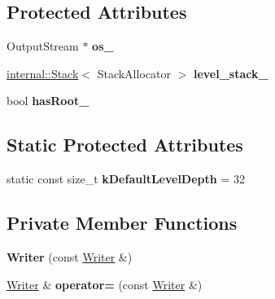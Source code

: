 \subsection*{Protected Attributes}
\begin{DoxyCompactItemize}
\item 
Output\+Stream $\ast$ {\bfseries os\+\_\+}\hypertarget{class_writer_a51ba99f008df7bbf32de311aa22b05ae}{}\label{class_writer_a51ba99f008df7bbf32de311aa22b05ae}

\item 
\hyperlink{classinternal_1_1_stack}{internal\+::\+Stack}$<$ Stack\+Allocator $>$ {\bfseries level\+\_\+stack\+\_\+}\hypertarget{class_writer_af179a9f272f80414d48f64ede9ddde12}{}\label{class_writer_af179a9f272f80414d48f64ede9ddde12}

\item 
bool {\bfseries has\+Root\+\_\+}\hypertarget{class_writer_af252ff409093ea786d5efce0d08d3804}{}\label{class_writer_af252ff409093ea786d5efce0d08d3804}

\end{DoxyCompactItemize}
\subsection*{Static Protected Attributes}
\begin{DoxyCompactItemize}
\item 
static const size\+\_\+t {\bfseries k\+Default\+Level\+Depth} = 32\hypertarget{class_writer_aad47efc97708b2a64e4a0994cbbfae25}{}\label{class_writer_aad47efc97708b2a64e4a0994cbbfae25}

\end{DoxyCompactItemize}
\subsection*{Private Member Functions}
\begin{DoxyCompactItemize}
\item 
{\bfseries Writer} (const \hyperlink{class_writer}{Writer} \&)\hypertarget{class_writer_a40b8917e24b632cdc339898028b9b911}{}\label{class_writer_a40b8917e24b632cdc339898028b9b911}

\item 
\hyperlink{class_writer}{Writer} \& {\bfseries operator=} (const \hyperlink{class_writer}{Writer} \&)\hypertarget{class_writer_afa3a774dd3d79533f572984175e7f5be}{}\label{class_writer_afa3a774dd3d79533f572984175e7f5be}

\end{DoxyCompactItemize}


